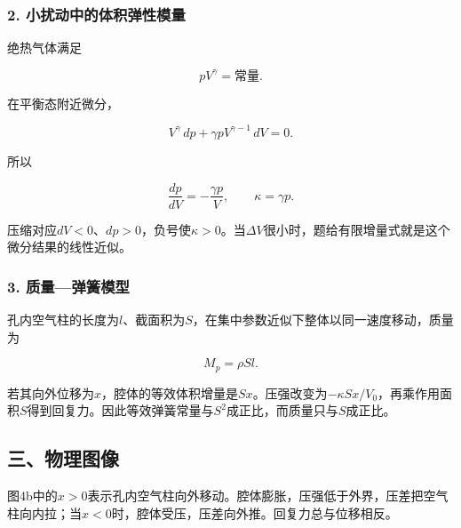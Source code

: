\documentclass[12pt,a4paper,fontset=fandol]{ctexart}
\begin{document}
\subsubsection{2.
小扰动中的体积弹性模量}\label{ux5c0fux6270ux52a8ux4e2dux7684ux4f53ux79efux5f39ux6027ux6a21ux91cf}

绝热气体满足

\[
pV^\gamma=\text{常量}.
\]

在平衡态附近微分，

\[
V^\gamma\,dp+\gamma pV^{\gamma-1}\,dV=0.
\]

所以

\[
\frac{dp}{dV}=-\frac{\gamma p}{V},
\qquad
\boxed{\kappa=\gamma p}.
\]

压缩对应\(dV<0\)、\(dp>0\)，负号使\(\kappa>0\)。当\(\Delta V\)很小时，题给有限增量式就是这个微分结果的线性近似。

\subsubsection{3.
质量---弹簧模型}\label{ux8d28ux91cfux5f39ux7c27ux6a21ux578b}

孔内空气柱的长度为\(l\)、截面积为\(S\)，在集中参数近似下整体以同一速度移动，质量为

\[
M_p=\rho Sl.
\]

若其向外位移为\(x\)，腔体的等效体积增量是\(Sx\)。压强改变为\(-\kappa Sx/V_0\)，再乘作用面积\(S\)得到回复力。因此等效弹簧常量与\(S^2\)成正比，而质量只与\(S\)成正比。

\subsection{三、物理图像}\label{ux4e09ux7269ux7406ux56feux50cf-3}

图4b中的\(x>0\)表示孔内空气柱向外移动。腔体膨胀，压强低于外界，压差把空气柱向内拉；当\(x<0\)时，腔体受压，压差向外推。回复力总与位移相反。

\begin{center}
\begin{minipage}{\linewidth}
\centering\begingroup{}
\ifdim\wd\diagrambox>.88\linewidth
\sbox{\diagrambox}{\resizebox{.88\linewidth}{!}{\usebox{\diagrambox}}}\fi
\ifdim\ht\diagrambox>.38\textheight
\resizebox{!}{.38\textheight}{\usebox{\diagrambox}}
\else\usebox{\diagrambox}\fi
\par{}\endgroup\end{minipage}\end{center}
\end{document}
